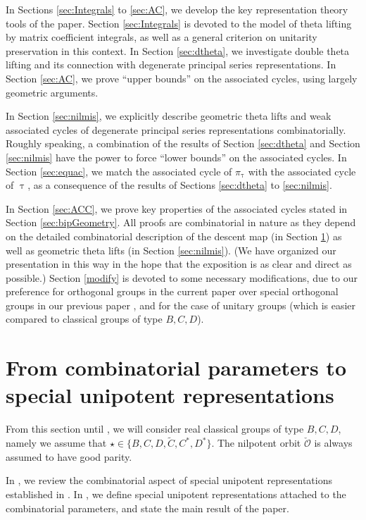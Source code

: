 \documentclass[11pt,a4paper]{amsart}
\newcommand{\CO}{{\mathcal {O}}}
\numberwithin{equation}{section}
\theoremstyle{remark}
\begin{document}
In Sections \ref{sec:Integrals} to \ref{sec:AC}, we develop the key representation theory tools of the paper. Section \ref{sec:Integrals} is devoted to the model of theta lifting by matrix coefficient integrals, as well as a general criterion on unitarity preservation in this context. In Section \ref{sec:dtheta}, we investigate double theta lifting and its connection with degenerate principal series representations. In  Section \ref{sec:AC}, we prove ``upper bounds'' on the associated cycles, using largely geometric arguments. 

In Section \ref{sec:nilmis}, we explicitly describe geometric theta lifts and weak associated cycles of degenerate principal series representations combinatorially. Roughly speaking, a combination of the results of Section \ref{sec:dtheta} and Section \ref{sec:nilmis} have the power to force ``lower bounds'' on the associated cycles. In Section \ref{sec:equac}, we match the associated cycle of $\pi_{\uptau}$ with the associated cycle of $\uptau$, as a consequence of the results of Sections \ref{sec:dtheta} to  \ref{sec:nilmis}.  
  
In Section \ref{sec:ACC}, we prove key properties of the associated cycles stated in 
Section \ref{sec:bipGeometry}. All proofs are combinatorial in nature as they depend on the detailed combinatorial description of the descent map (in Section 
\ref{sec:bip}) as well as geometric theta lifts (in 
Section \ref{sec:nilmis}).  (We have organized our presentation in this way in the hope that the exposition is as clear and direct as possible.) Section \ref{modify} is devoted to some necessary modifications, due to our preference for orthogonal groups in the current paper over special orthogonal groups in our previous paper \cite{BMSZa}, and for the case of unitary groups (which is easier compared to  classical groups of type $B,C,D$).


\section{From combinatorial parameters to special unipotent representations}\label{sec:bip}

From this section until , we will consider real classical groups of type $B,C,D$, namely we  assume that $\star\in \{B,C,D,\widetilde {C}, C^*, D^*\}$. The nilpotent orbit $\check \CO$ is always assumed to have good parity. 

In , we review the combinatorial aspect of special unipotent representations established in \cite{BMSZa}.
In , we define special unipotent representations attached to the combinatorial parameters, and state the main result of the paper.
\end{document}
